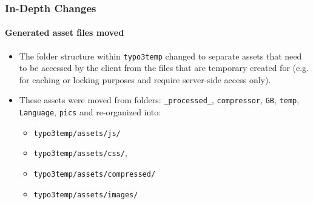 \begin{frame}[fragile]
	\frametitle{In-Depth Changes}
	\framesubtitle{Generated asset files moved}

	\lstset{basicstyle=\tiny\ttfamily}

	\begin{itemize}

		\item The folder structure within \texttt{typo3temp} changed to separate assets
			that need to be accessed by the client from the files that are temporary
			created for (e.g. for caching or locking purposes and require server-side
			access only).

		\item These assets were moved from folders:\newline
			\texttt{\_processed\_}, \texttt{compressor}, \texttt{GB}, \texttt{temp},
			\texttt{Language}, \texttt{pics}\newline
			and re-organized into:

			\begin{itemize}
				\item \texttt{typo3temp/assets/js/}
				\item \texttt{typo3temp/assets/css/},
				\item \texttt{typo3temp/assets/compressed/}
				\item \texttt{typo3temp/assets/images/}
			\end{itemize}

	\end{itemize}

\end{frame}

